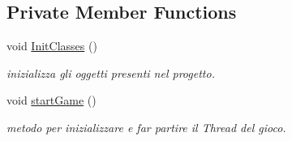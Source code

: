 \subsection*{Private Member Functions}
\begin{DoxyCompactItemize}
\item 
void \hyperlink{classprogetto_1_1_game_a3e57c234c3dde4539f8b9c47d75e59ae}{Init\+Classes} ()
\begin{DoxyCompactList}\small\item\em inizializza gli oggetti presenti nel progetto. \end{DoxyCompactList}\item 
void \hyperlink{classprogetto_1_1_game_ab1f321a2f17fa8ba0f5ab4e2621fd6d6}{start\+Game} ()
\begin{DoxyCompactList}\small\item\em metodo per inizializzare e far partire il Thread del gioco. \end{DoxyCompactList}\end{DoxyCompactItemize}
